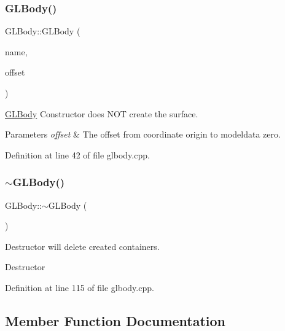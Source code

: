 \subsubsection{\texorpdfstring{GLBody()}{GLBody()}\hspace{0.1cm}{\footnotesize\ttfamily [2/2]}}
{\footnotesize\ttfamily G\+L\+Body\+::\+G\+L\+Body (\begin{DoxyParamCaption}\item[{Q\+String}]{name,  }\item[{const Q\+Vector3D}]{offset }\end{DoxyParamCaption})}



\mbox{\hyperlink{class_g_l_body}{G\+L\+Body}} Constructor does N\+OT create the surface. 


\begin{DoxyParams}{Parameters}
{\em offset} & The offset from coordinate origin to modeldata zero. \\
\hline
\end{DoxyParams}


Definition at line 42 of file glbody.\+cpp.

\mbox{\label{class_g_l_body_ac6cd2e5f6d0115cf6f6f0ae84c9d91a1}} 
\subsubsection{\texorpdfstring{$\sim$GLBody()}{~GLBody()}}
{\footnotesize\ttfamily G\+L\+Body\+::$\sim$\+G\+L\+Body (\begin{DoxyParamCaption}{ }\end{DoxyParamCaption})\hspace{0.3cm}{\ttfamily [virtual]}}

Destructor will delete created containers.

Destructor 

Definition at line 115 of file glbody.\+cpp.



\subsection{Member Function Documentation}
\mbox{\label{class_g_l_body_a4a0a876d516652e66c2269c18d4032bc}} 

